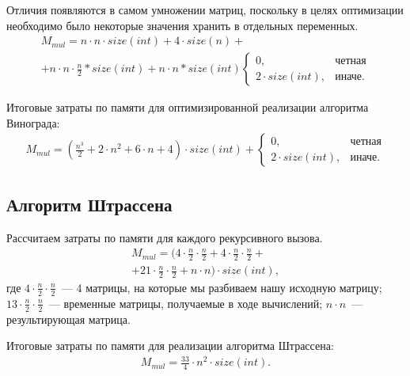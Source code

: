 Отличия появляются в самом умножении матриц, поскольку в целях оптимизации необходимо было некоторые значения хранить в отдельных переменных.
\begin{equation}
	\label{eq:mem_vinopt}
	\begin{gathered}
		M_{mul} = n \cdot n \cdot size(int) + 4 \cdot size(n) + \\ + n \cdot n \cdot \frac{n}{2} * size(int) + n \cdot n * size(int)
			\begin{cases}
				0, & \text{четная} \\
				2 \cdot size(int), & \text{иначе}.
			\end{cases}
	\end{gathered}
\end{equation}

Итоговые затраты по памяти для оптимизированной реализации алгоритма Винограда:
\begin{equation}
	\label{eq:mem_vinopt_res}
	\begin{gathered}
		M_{mul} = (\frac{n^{3}}{2} + 2 \cdot n^{2} + 6 \cdot n + 4) \cdot size(int) +
		\begin{cases}
			0, & \text{четная} \\
			2 \cdot size(int), & \text{иначе}.
		\end{cases}
	\end{gathered}
\end{equation}

\subsection*{Алгоритм Штрассена}
Рассчитаем затраты по памяти для каждого рекурсивного вызова.
\begin{equation}
	\label{eq:mem_stras}
	\begin{gathered}
		M_{mul} = (4 \cdot \frac{n}{2} \cdot \frac{n}{2} + 4 \cdot \frac{n}{2} \cdot \frac{n}{2} + \\ + 21 \cdot \frac{n}{2} \cdot \frac{n}{2} + n \cdot n) \cdot size(int),
	\end{gathered}
\end{equation}
где $4 \cdot \frac{n}{2} \cdot \frac{n}{2}$~--- 4 матрицы, на которые мы разбиваем нашу исходную матрицу;
\newline $13 \cdot \frac{n}{2} \cdot \frac{n}{2}$~--- временные матрицы, получаемые в ходе вычислений;
\newline $n \cdot n$~--- результирующая матрица.

Итоговые затраты по памяти для реализации алгоритма Штрассена:
\begin{equation}
	\label{eq:mem_stras_res}
	\begin{gathered}
		M_{mul} = \frac{33}{4} \cdot n^{2} \cdot size(int).
	\end{gathered}
\end{equation}
